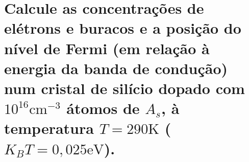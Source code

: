 \section*{Calcule as concentrações  de elétrons e buracos  e a posição
do nível  de Fermi  (em relação  à energia da  banda de  condução) num
cristal de silício dopado com $10^{16} \si{\centi\meter^{-3}}$ átomos de
$A_{s}$,  à  temperatura  $T  = 290  \si{\kelvin}$  ($K_{B}T  =  0,025
\si{\electronvolt}$).}
\label{q21}

